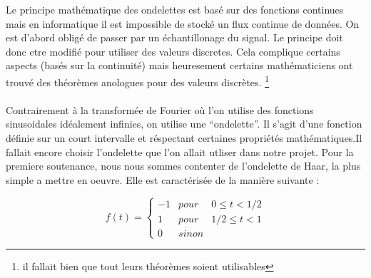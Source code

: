 \documentclass[a4paper,12pt]{article}
\begin{document}
Le principe mathématique des ondelettes est basé sur des fonctions continues
mais en informatique il est impossible de stocké un flux continue de données. On
est d'abord obligé de passer par un échantillonage du signal. Le principe doit
donc etre modifié pour utiliser des valeurs discretes. Cela complique certains
aspects (basés sur la continuité) mais heuresement certains mathématiciens ont
trouvé des théorèmes anologues pour des valeurs discrètes. \footnote{il fallait bien que
tout leurs théorèmes soient utilisables}\\\\
Contrairement à la transformée de Fourier où l'on utilise des fonctions
sinusoidales idéalement infinies, on utilise une ``ondelette''. Il s'agit d'une
fonction définie sur un court intervalle et réspectant certaines propriétés
mathématiques.Il fallait encore choisir l'ondelette que l'on allait utliser dans
notre projet.  Pour la premiere soutenance, nous nous sommes contenter de
l'ondelette de Haar, la plus simple a mettre en oeuvre. Elle est caractérisée de
la manière suivante :

$$ f(t) = \left\{\begin{array}{rcl} -1 & pour & 0 \leq t < 1/2 \\ 1 & pour & 1/2 \leq t < 1 \\ 0 & sinon & \end{array} \right.$$
\end{document}
